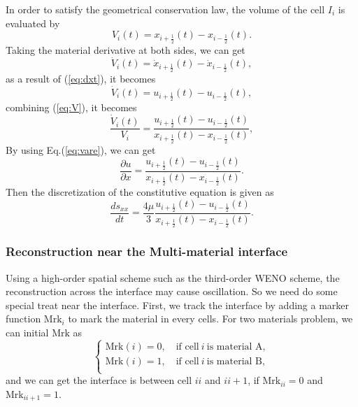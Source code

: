 \documentclass{article}
\numberwithin{equation}{section}
\numberwithin{table}{section}
\begin{document}
In order to satisfy the geometrical conservation law, the volume of the cell $I_i$ is evaluated by
\begin{equation}\label{eq:V}
  V_i(t) = x_{i+\frac{1}{2}}(t) - x_{i-\frac{1}{2}}(t).
\end{equation}
Taking the material derivative at both sides, we can get
\begin{equation}\label{eq:dotV}
  \dot{V}_i(t) = \dot{x}_{i+\frac{1}{2}}(t) - \dot{x}_{i-\frac{1}{2}}(t),
\end{equation}
as a result of (\ref{eq:dxt}), it becomes
\begin{equation}\label{eq:dotV}
  \dot{V}_i(t) = u_{i+\frac{1}{2}}(t) - u_{i-\frac{1}{2}}(t),
\end{equation}
combining (\ref{eq:V}), it becomes
\begin{equation}
  \frac{\dot{V}_i(t)}{V_i} =\frac{ u_{i+\frac{1}{2}}(t) - u_{i-\frac{1}{2}}(t)}{ x_{i+\frac{1}{2}}(t) - x_{i-\frac{1}{2}}(t)},
\end{equation}
By using Eq.(\ref{eq:vare}), we can get
\begin{equation}
  \frac{\partial u}{\partial x} =\frac{ u_{i+\frac{1}{2}}(t) - u_{i-\frac{1}{2}}(t)}{ x_{i+\frac{1}{2}}(t) - x_{i-\frac{1}{2}}(t)}.
\end{equation}
Then  the  discretization of the constitutive equation is given as
\begin{equation}\label{eq:semSxx}
  \frac{d s_{xx}}{dt } =\frac{4\mu}{3} \frac{ u_{i+\frac{1}{2}}(t) - u_{i-\frac{1}{2}}(t)}{ x_{i+\frac{1}{2}}(t) - x_{i-\frac{1}{2}}(t)}.
\end{equation}


\subsubsection{Reconstruction near the Multi-material interface}

Using a high-order spatial  scheme  such as the third-order WENO scheme,  the reconstruction across the interface may cause oscillation. So we need do some special treat near the interface.  First, we track the interface  by  adding  a marker function $\text{Mrk}_i$  to mark the material  in every cells. For two materials problem, we can initial $\text{Mrk}$ as 
\begin{equation}
  \left\{
  \begin{aligned}
	\text{Mrk}(i) = 0 ,\quad \text{if cell} \ i \ \text{is  material A}, \\
	\text{Mrk}(i) = 1 ,\quad \text{if cell} \ i \ \text{is  material B}, \\
\end{aligned}
\right.
\end{equation}
and we can get the interface is between cell $ii$ and $ii+1$,  if $\text{Mrk}_{ii} = 0$ and   $\text{Mrk}_{ii+1} = 1$.
\end{document}
